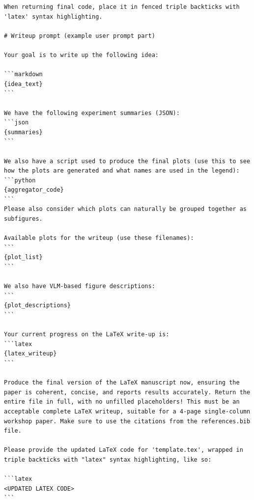 \begin{appendices}
\begin{tcolorbox}[breakable, colback=orange!5!white, colframe=orange!80!black, title=Manuscript Writing Prompt (ICBINB workshop specific)]
\begin{Verbatim}[breaklines, breaksymbol={}, breaksymbolleft={}, fontsize=\small]
When returning final code, place it in fenced triple backticks with 'latex' syntax highlighting.

# Writeup prompt (example user prompt part)

Your goal is to write up the following idea:

```markdown
{idea_text}
```

We have the following experiment summaries (JSON):
```json
{summaries}
```

We also have a script used to produce the final plots (use this to see how the plots are generated and what names are used in the legend):
```python
{aggregator_code}
```
Please also consider which plots can naturally be grouped together as subfigures.

Available plots for the writeup (use these filenames):
```
{plot_list}
```

We also have VLM-based figure descriptions:
```
{plot_descriptions}
```

Your current progress on the LaTeX write-up is:
```latex
{latex_writeup}
```

Produce the final version of the LaTeX manuscript now, ensuring the paper is coherent, concise, and reports results accurately. Return the entire file in full, with no unfilled placeholders! This must be an acceptable complete LaTeX writeup, suitable for a 4-page single-column workshop paper. Make sure to use the citations from the references.bib file.

Please provide the updated LaTeX code for 'template.tex', wrapped in triple backticks with "latex" syntax highlighting, like so:

```latex
<UPDATED LATEX CODE>
```
\end{Verbatim}
\end{tcolorbox}


\end{appendices}
